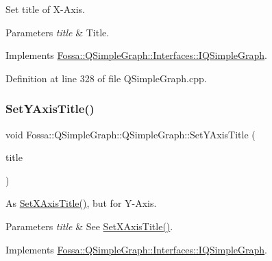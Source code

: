 Set title of X-\/\+Axis. 


\begin{DoxyParams}{Parameters}
{\em title} & Title. \\
\hline
\end{DoxyParams}


Implements \hyperlink{class_fossa_1_1_q_simple_graph_1_1_interfaces_1_1_i_q_simple_graph_adfca7d41a47790e8403507544468ba86}{Fossa\+::\+Q\+Simple\+Graph\+::\+Interfaces\+::\+I\+Q\+Simple\+Graph}.



Definition at line 328 of file Q\+Simple\+Graph.\+cpp.

\mbox{\label{class_fossa_1_1_q_simple_graph_1_1_q_simple_graph_a41c9e9d34744f6e6550ca97dc0d2f488}} 
\subsubsection{\texorpdfstring{Set\+Y\+Axis\+Title()}{SetYAxisTitle()}}
{\footnotesize\ttfamily void Fossa\+::\+Q\+Simple\+Graph\+::\+Q\+Simple\+Graph\+::\+Set\+Y\+Axis\+Title (\begin{DoxyParamCaption}\item[{Q\+String}]{title }\end{DoxyParamCaption})\hspace{0.3cm}{\ttfamily [virtual]}}



As \hyperlink{class_fossa_1_1_q_simple_graph_1_1_q_simple_graph_a7579da572b54d43ccec3d2bd572b6cfa}{Set\+X\+Axis\+Title()}, but for Y-\/\+Axis. 


\begin{DoxyParams}{Parameters}
{\em title} & See \hyperlink{class_fossa_1_1_q_simple_graph_1_1_q_simple_graph_a7579da572b54d43ccec3d2bd572b6cfa}{Set\+X\+Axis\+Title()}. \\
\hline
\end{DoxyParams}


Implements \hyperlink{class_fossa_1_1_q_simple_graph_1_1_interfaces_1_1_i_q_simple_graph_a606c07c40ed294cdd568de5488875af5}{Fossa\+::\+Q\+Simple\+Graph\+::\+Interfaces\+::\+I\+Q\+Simple\+Graph}.



